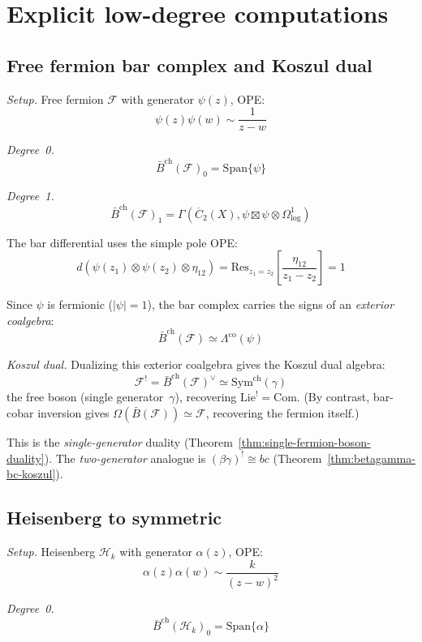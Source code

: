 \section{Explicit low-degree computations}
\label{sec:explicit-low-degree}

\subsection{Free fermion bar complex and Koszul dual}

\noindent\emph{Setup.} Free fermion $\mathcal{F}$ with generator $\psi(z)$, OPE:
\[\psi(z)\psi(w) \sim \frac{1}{z-w}\]

\emph{Degree~0.}
\[\bar{B}^{\text{ch}}(\mathcal{F})_0 = \text{Span}\{\psi\}\]

\emph{Degree~1.}
\[\bar{B}^{\text{ch}}(\mathcal{F})_1 = \Gamma\left(\overline{C}_2(X),
   \psi \boxtimes \psi \otimes \Omega^1_{\log}\right)\]

The bar differential uses the simple pole OPE:
\[d(\psi(z_1) \otimes \psi(z_2) \otimes \eta_{12}) = \text{Res}_{z_1 = z_2}\left[\frac{\eta_{12}}{z_1-z_2}\right] = 1\]

Since $\psi$ is fermionic ($|\psi| = 1$), the bar complex carries the signs of an \emph{exterior coalgebra}:
\[\bar{B}^{\text{ch}}(\mathcal{F}) \simeq \Lambda^{\text{co}}(\psi)\]

\emph{Koszul dual.} Dualizing this exterior coalgebra gives the Koszul dual algebra:
\[\mathcal{F}^! = \bar{B}^{\mathrm{ch}}(\mathcal{F})^\vee \simeq \mathrm{Sym}^{\mathrm{ch}}(\gamma)\]
the free boson (single generator~$\gamma$), recovering $\mathrm{Lie}^! = \mathrm{Com}$.  (By contrast, bar-cobar inversion gives $\Omega(\bar{B}(\mathcal{F})) \simeq \mathcal{F}$, recovering the fermion itself.)

This is the \emph{single-generator} duality (Theorem~\ref{thm:single-fermion-boson-duality}).  The \emph{two-generator} analogue is $(\beta\gamma)^! \cong bc$ (Theorem~\ref{thm:betagamma-bc-koszul}).

\subsection{Heisenberg to symmetric}

\noindent\emph{Setup.} Heisenberg $\mathcal{H}_k$ with generator $\alpha(z)$, OPE:
\[\alpha(z)\alpha(w) \sim \frac{k}{(z-w)^2}\]

\emph{Degree~0.}
\[\bar{B}^{\text{ch}}(\mathcal{H}_k)_0 = \text{Span}\{\alpha\}\]

